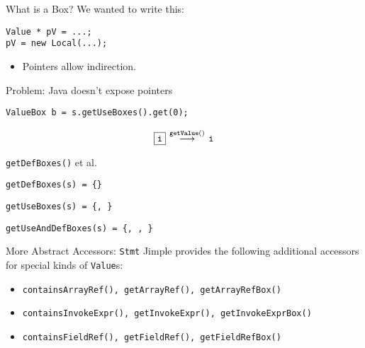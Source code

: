 \begin{slide}{What is a Box?}
We wanted to write this:

\begin{tabbing}
\qquad \= {\tt Value * pV = ...;}\\
       \> {\tt *pV = new Local(...);}
\end{tabbing}


\vspace*{-0.05in}
\begin{itemize}
\item Pointers allow indirection.
\end{itemize}

Problem: Java doesn't expose pointers

\vspace*{0.05in}
\begin{tabbing}
\quad \= {\tt ValueBox b = s.getUseBoxes().get(0);}\\
\end{tabbing}

\[ \fbox{\tt i} \: \mathop{\longrightarrow}^{\small \tt getValue()} \: \mbox{\tt i} \]

\end{slide}

\begin{slide}{{\tt getDefBoxes()} et al.}

\begin{center}
\end{center}

\quad

{\tt getDefBoxes(s) = \{\}}\\

\quad

{\tt getUseBoxes(s) = \{, \}}\\

\quad

{\tt getUseAndDefBoxes(s) = \{, , \}}\\

\end{slide}

\begin{slide}{More Abstract Accessors: {\tt Stmt}}
Jimple provides the following additional accessors for special kinds of {\tt Value}s:

\begin{itemize}
\item {\tt containsArrayRef(),
 getArrayRef(),~getArrayRefBox()}
\item {\tt containsInvokeExpr(), getInvokeExpr(),~getInvokeExprBox()}
\item {\tt containsFieldRef(), getFieldRef(),~getFieldRefBox()}
\end{itemize}

\end{slide}


